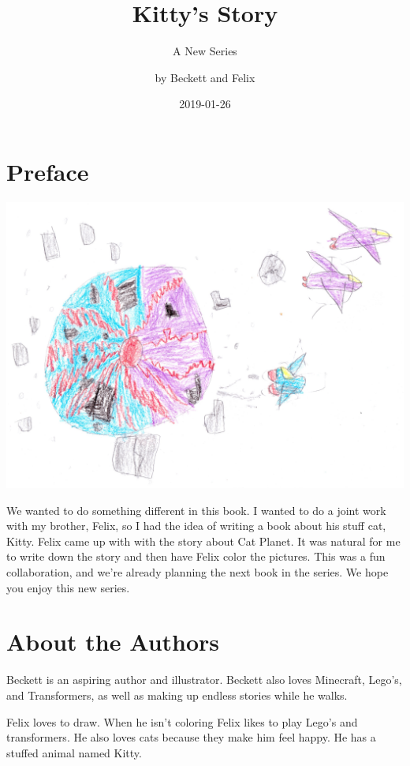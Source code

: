 \documentclass[12pt,oneside]{krantz}
\title{Kitty's Story}
\subtitle{A New Series}
\author{by Beckett and Felix}
\date{2019-01-26}
\begin{document}
\maketitle

{
\setcounter{tocdepth}{1}
\tableofcontents
}
\hypertarget{preface}{%
\chapter*{Preface}\label{preface}}


\includegraphics{img/catplanet.jpg}

We wanted to do something different in this book. I wanted to do a joint
work with my brother, Felix, so I had the idea of writing a book about
his stuff cat, Kitty. Felix came up with with the story about Cat
Planet. It was natural for me to write down the story and then have
Felix color the pictures. This was a fun collaboration, and we're
already planning the next book in the series. We hope you enjoy this new
series.

\hypertarget{about-the-authors}{%
\chapter*{About the Authors}\label{about-the-authors}}


Beckett is an aspiring author and illustrator. Beckett also loves
Minecraft, Lego's, and Transformers, as well as making up endless
stories while he walks.

Felix loves to draw. When he isn't coloring Felix likes to play Lego's
and transformers. He also loves cats because they make him feel happy.
He has a stuffed animal named Kitty.
\end{document}
